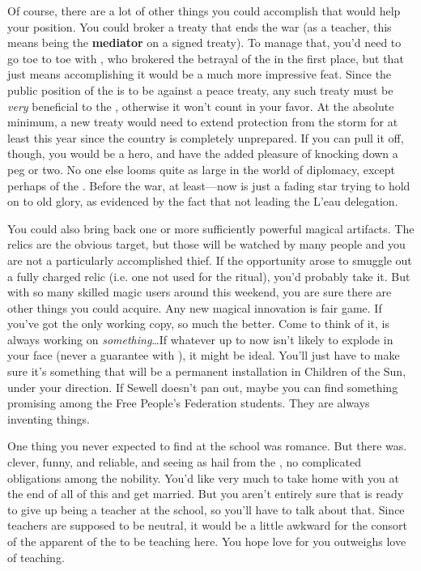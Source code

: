 \documentclass[char]{GL2020}
\begin{document}
Of course, there are a lot of other things you could accomplish that would help your position. You could broker a treaty that ends the war (as a teacher, this means being the \textbf{mediator} on a signed treaty). To manage that, you'd need to go toe to toe with \cDiplomat{\full}, who brokered the betrayal of the \pShip{} in the first place, but that just means accomplishing it would be a much more impressive feat. Since the public position of the \pFarm{} is to be against a peace treaty, any such treaty must be \emph{very} beneficial to the \pFarm{}, otherwise it won't count in your favor. At the absolute minimum, a new treaty would need to extend protection from the storm for at least this year since the country is completely unprepared. If you can pull it off, though, you would be a hero, and have the added pleasure of knocking \cDiplomat{} down a peg or two. No one else looms quite as large in the world of diplomacy, except perhaps \cHeadDiplomat{\full} of the \pShip{}. Before the war, at least---now \cHeadDiplomat{} is just a fading star trying to hold on to old glory, as evidenced by the fact that \cHeadDiplomat{\theyare} not leading the L'eau delegation.

You could also bring back one or more sufficiently powerful magical artifacts. The relics are the obvious target, but those will be watched by many people and you are not a particularly accomplished thief. If the opportunity arose to smuggle out a fully charged relic (i.e. one not used for the ritual), you'd probably take it. But with so many skilled magic users around this weekend, you are sure there are other things you could acquire. Any new magical innovation is fair game. If you've got the only working copy, so much the better. Come to think of it, \cCurse{\full} is always working on \emph{something}\ldots{}If whatever \cCurse{\theyare} up to now isn't likely to explode in your face (never a guarantee with \cCurse{}), it might be ideal. You'll just have to make sure it's something that will be a permanent installation in Children of the Sun, under your direction. If Sewell doesn't pan out, maybe you can find something promising among the Free People's Federation students. They are always inventing things.

One thing you never expected to find at the school was romance. But there \cPirate{} was. \cPirate{\They} \cPirate{\are} clever, funny, and reliable, and seeing as \cPirate{\they} hail\cPirate{\plural} from the \pShip{}, \cPirate{\have} no complicated obligations among the \pFarm{} nobility. You'd like very much to take \cPirate{} home with you at the end of all of this and get married. But you aren't entirely sure that \cPirate{} is ready to give up being a teacher at the school, so you'll have to talk about that. Since teachers are supposed to be neutral, it would be a little awkward for the consort of the \cPrince{\heir} apparent of the \pFarm{} to be teaching here. You hope \cPirate{\their} love for you outweighs \cPirate{\their} love of teaching.
\end{document}
